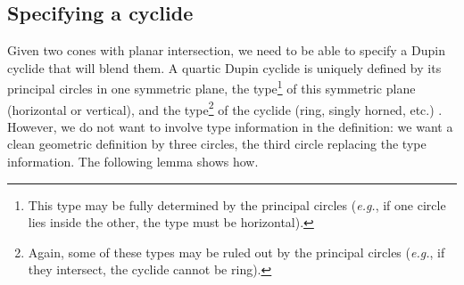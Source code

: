 \subsection{Specifying a cyclide}
\label{section:spec}

Given two cones with planar intersection, we need to be able to specify
a Dupin cyclide that will blend them.  
A quartic Dupin cyclide is uniquely defined by its principal circles in one
symmetric plane, the type\footnote{This type may be fully determined by the
	principal circles ({\it e.g.}, if one circle lies inside the other, 
	the type must be horizontal).}
of this symmetric plane (horizontal or vertical),
and the type\footnote{Again, some of these types may be ruled out 
	by the principal circles ({\it e.g.}, if they intersect, the cyclide
	cannot be ring).} 
of the cyclide (ring, singly horned, etc.) \cite{jj92}.
However, we do not want to involve type information in the definition:
we want a clean geometric definition by three circles, the third circle
replacing the type information.
The following lemma shows how.

